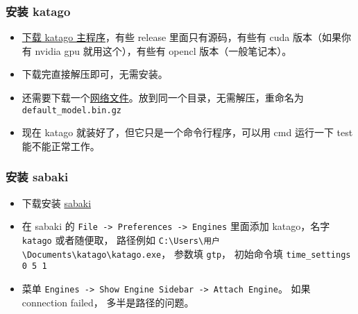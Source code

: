 
\begin{issues}
\issueDraft
\end{issues}

\subsubsection{安装 katago}
\begin{itemize}
\item \href{https://github.com/lightvector/KataGo/releases}{下载 katago 主程序}，有些 release 里面只有源码，有些有 cuda 版本（如果你有 nvidia gpu 就用这个），有些有 opencl 版本（一般笔记本）。
\item 下载完直接解压即可，无需安装。
\item 还需要下载一个\href{https://katagotraining.org/networks/}{网络文件}。放到同一个目录，无需解压，重命名为 \verb|default_model.bin.gz|
\item 现在 katago 就装好了，但它只是一个命令行程序，可以用 cmd 运行一下 test 能不能正常工作。
\end{itemize}

\subsubsection{安装 sabaki}
\begin{itemize}
\item 下载安装 \href{https://sabaki.yichuanshen.de/}{sabaki}
\item 在 sabaki 的 \verb|File -> Preferences -> Engines| 里面添加 katago，名字 \verb|katago| 或者随便取， 路径例如 \verb|C:\Users\用户\Documents\katago\katago.exe|， 参数填 \verb|gtp|， 初始命令填 \verb|time_settings 0 5 1|
\item 菜单 \verb|Engines -> Show Engine Sidebar -> Attach Engine|。 如果 connection failed， 多半是路径的问题。
\end{itemize}
